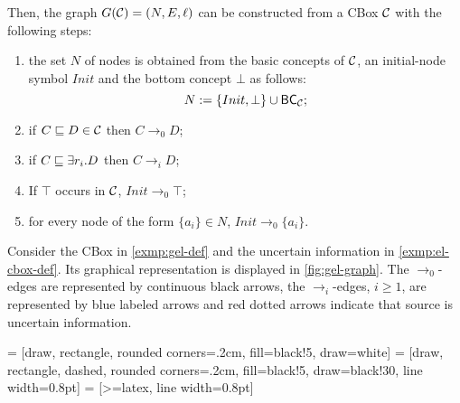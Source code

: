 Then, the graph $G(\mathcal{C}) = (N, E, \ell)$ can be constructed from a CBox $\mathcal{C}$ with the following steps:
\begin{enumerate}
	\item the set $N$ of nodes is obtained from the basic concepts of $\mathcal{C}$, an initial-node symbol $Init$ and the bottom concept $\bot$ %
	as follows:
		  \[ N := \{Init, \bot\} \cup \textsf{BC}_{\mathcal{C}} 
		  ; 
		  \]
	\item if $C \sqsubseteq D \in \mathcal{C}$ then $C \to_0 D$;
	\item if $C \sqsubseteq \exists r_i.D$ then $C \to_i D$;
	\item If $\top$ occurs in $\mathcal{C}$, $Init \to_0 \top$;
	\item for every node of the form $\{a_i\} \in N$, $Init \to_0 \{a_i\}$.
\end{enumerate}

\begin{example}
	Consider the CBox in \cref{exmp:gel-def} and the uncertain information in \cref{exmp:el-cbox-def}. Its graphical representation is displayed in \cref{fig:gel-graph}. The $\to_0$-edges are represented by continuous black arrows, the $\to_i$-edges, $i \geq 1$, are represented by blue labeled arrows and red dotted arrows indicate that source is uncertain information.
\end{example}

 = [draw, rectangle, rounded corners=.2cm, fill=black!5, draw=white]
 = [draw, rectangle, dashed, rounded corners=.2cm, fill=black!5, draw=black!30, line width=0.8pt]
 = [>=latex, line width=0.8pt]

